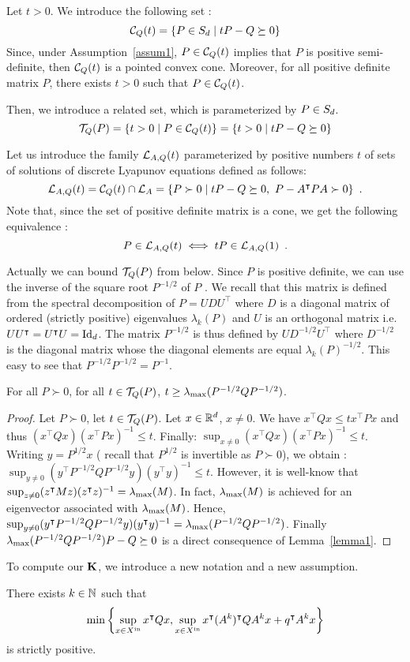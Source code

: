 \documentclass[10pt]{article}
\begin{document}
Let $t>0$. We introduce the following set :  
\[
\mathcal{C}_{Q}(t)=\{P\in S_d\mid tP-Q\succeq 0\}
\]
Since, under Assumption~\ref{assum1}, $P\in\mathcal{C}_{Q}(t)$ implies that $P$ is positive semi-definite, then $\mathcal{C}_{Q}(t)$ is a pointed convex cone. Moreover, for all positive definite matrix $P$, there exists $t>0$ such that $P\in \mathcal{C}_{Q}(t)$. 

Then, we introduce a related set, which is parameterized by $P\in S_d$.
\[
\mathcal{T}_{Q}(P)=\{t>0\mid P\in\mathcal{C}_{Q}(t) \}=\{t>0\mid tP-Q\succeq 0\}
\]

Let us introduce the family $\mathcal{L}_{A,Q}(t)$ parameterized by positive numbers $t$ of sets of solutions of discrete Lyapunov equations defined as follows:
\[
\mathcal{L}_{A,Q}(t)=\mathcal{C}_{Q}(t)\cap\mathcal{L}_{A}=\{P\succ 0\mid tP-Q\succeq 0,\ P-A^\intercal P A\succ 0\}\enspace. 
\]
Note that, since the set of positive definite matrix is a cone, we get the following equivalence :
\begin{equation}
\label{simpleequiv}
P\in\mathcal{L}_{A,Q}(t)\iff tP\in\mathcal{L}_{A,Q}(1)\enspace.
\end{equation}
 
Actually we can bound $\mathcal{T}_{Q}(P)$ from below. Since $P$ is positive definite, we can use the inverse of the square root $P^{-1/2}$ of $P$ . We recall that this matrix is defined from the spectral decomposition of $P=U D U^\intercal$ where $D$ is a diagonal  matrix of ordered (strictly positive) eigenvalues $\lambda_k(P)$ and $U$ is an orthogonal matrix i.e. $U U^\intercal = U^\intercal U=\operatorname{Id}_d$.   The matrix  $P^{-1/2}$ is thus defined by 
$U D^{-1/2} U^\intercal$ where $D^{-1/2}$ is the diagonal matrix whose the diagonal elements are equal $\lambda_k(P)^{-1/2}$. This easy to see that $P^{-1/2} P^{-1/2}=P^{-1}$. 

\begin{prop}
\label{propcont}
For all $P\succ 0$, for all $t\in\mathcal{T}_{Q}(P)$, $t\geq \lambda_{\operatorname{max}}(P^{-1/2} Q P^{-1/2})$.
\end{prop}
\begin{proof}
Let $P\succ 0$, let $t\in\mathcal{T}_{Q}(P)$. Let $x\in\mathbb R^d$, $x\neq 0$. We have 
$x^\intercal Q x\leq t x^\intercal P x$ and thus $(x^\intercal Q x)(x^\intercal P x)^{-1}\leq t$. Finally:
$\sup_{x\neq 0}(x^\intercal Q x)(x^\intercal P x)^{-1}\leq t $. Writing $y=P^{1/2}x$ ( recall that $P^{1/2}$ is invertible as $P\succ 0$), we obtain :
$\sup_{y\neq 0}(y^\intercal P^{-1/2}Q P^{-1/2}y)(y^\intercal y)^{-1}\leq t $. However, it is well-know that
$\sup_{z\neq 0} (z^\intercal M z)(z^\intercal z)^{-1}=\lambda_{\operatorname{max}}(M)$. In fact, $\lambda_{\operatorname{max}}(M)$ is achieved for an eigenvector associated with $\lambda_{\operatorname{max}}(M)$. Hence, 
$\sup_{y\neq 0} (y^\intercal P^{-1/2}Q P^{-1/2}y)(y^\intercal y)^{-1}=\lambda_{\operatorname{max}}(P^{-1/2} Q P^{-1/2})$. Finally $\lambda_{\operatorname{max}}(P^{-1/2} Q P^{-1/2})P-Q\succeq 0$ is a direct consequence of Lemma~\ref{lemma1}. 

\end{proof}
To compute our $\mathbf{K}$, we introduce a new notation and a new assumption. 
 \begin{assumption}
\label{assumR}
There exists $k\in\mathbb{N}$ such that\[\min\left\{\sup_{x\in X^\mathrm{in}} x^\intercal Q x , \sup_{x\in X^\mathrm{in}} x^\intercal (A^k)^\intercal Q A^k x+q^\intercal A^k x\right\}\] is strictly positive.
\end{assumption}
\end{document}

